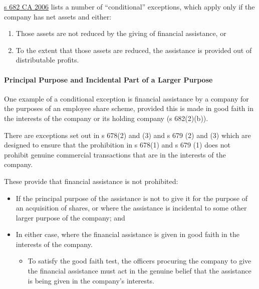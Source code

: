 \documentclass[
]{article}
\providecommand{\tightlist}{%
  \setlength{\itemsep}{0pt}\setlength{\parskip}{0pt}}
\begin{document}
\href{https://www.legislation.gov.uk/ukpga/2006/46/section/682}{s 682 CA
2006} lists a number of ``conditional'' exceptions, which apply only if
the company has net assets and either:

\begin{enumerate}
\tightlist
\item
  Those assets are not reduced by the giving of financial assistance, or
\item
  To the extent that those assets are reduced, the assistance is
  provided out of distributable profits.
\end{enumerate}

\hypertarget{principal-purpose-and-incidental-part-of-a-larger-purpose}{%
\paragraph{Principal Purpose and Incidental Part of a Larger
Purpose}\label{principal-purpose-and-incidental-part-of-a-larger-purpose}}

One example of a conditional exception is financial assistance by a
company for the purposes of an employee share scheme, provided this is
made in good faith in the interests of the company or its holding
company (s 682(2)(b)).

There are exceptions set out in s 678(2) and (3) and s 679 (2) and (3)
which are designed to ensure that the prohibition in s 678(1) and s 679
(1) does not prohibit genuine commercial transactions that are in the
interests of the company.

These provide that financial assistance is not prohibited:

\begin{itemize}
\tightlist
\item
  If the principal purpose of the assistance is not to give it for the
  purpose of an acquisition of shares, or where the assistance is
  incidental to some other larger purpose of the company; and
\item
  In either case, where the financial assistance is given in good faith
  in the interests of the company.

  \begin{itemize}
  \tightlist
  \item
    To satisfy the good faith test, the officers procuring the company
    to give the financial assistance must act in the genuine belief that
    the assistance is being given in the company's interests.
  \end{itemize}
\end{itemize}
\end{document}
